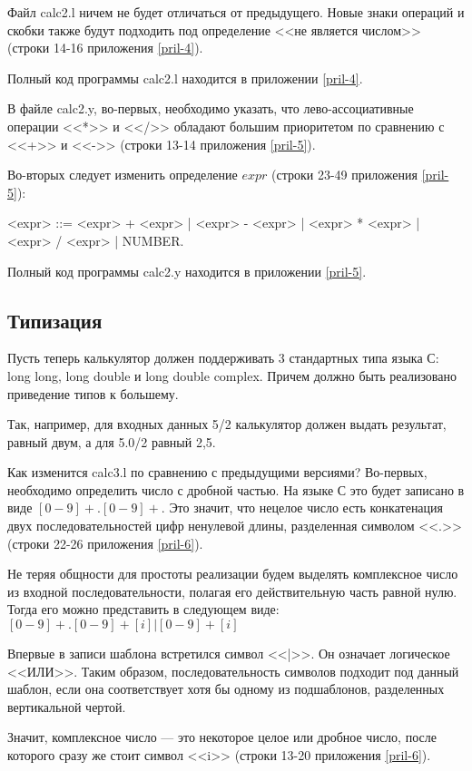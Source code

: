 \documentclass[bachelor, och, coursework, times]{SCWorks}
\begin{document}
Файл calc2.l ничем не будет отличаться от предыдущего. Новые знаки операций и скобки также будут подходить под определение <<не является числом>> (строки 14-16 приложения \ref{pril-4}).

Полный код программы calc2.l находится в приложении \ref{pril-4}.

В файле calc2.y, во-первых, необходимо указать, что лево-ассоциативные операции <<*>> и <</>> обладают большим приоритетом по сравнению с <<+>> и <<->> (строки 13-14 приложения \ref{pril-5}).

Во-вторых следует изменить определение $expr$ (строки 23-49 приложения \ref{pril-5}): 

<expr> ::= <expr> + <expr> | <expr> - <expr> | <expr> * <expr> | <expr> / <expr> | NUMBER.

Полный код программы calc2.y находится в приложении \ref{pril-5}.

\subsection{Типизация}
Пусть теперь калькулятор должен поддерживать 3 стандартных типа языка С: long long, long double и long double complex. Причем должно быть реализовано приведение типов к большему.

Так, например, для входных данных 5/2 калькулятор должен выдать результат, равный двум, а для 5.0/2 равный 2,5.

Как изменится calc3.l по сравнению с предыдущими версиями?
Во-первых, необходимо определить число с дробной частью. На языке С это будет записано в виде $[0-9]+.[0-9]+$. Это значит, что нецелое число есть конкатенация двух последовательностей цифр ненулевой длины, разделенная символом <<.>>(строки 22-26 приложения \ref{pril-6}).

Не теряя общности для простоты реализации будем выделять комплексное число из входной последовательности, полагая его действительную часть равной нулю.
Тогда его можно представить в следующем виде: \linebreak
$[0-9]+.[0-9]+[i] | [0-9]+[i]$

Впервые в записи шаблона встретился символ <<|>>. Он означает логическое <<ИЛИ>>. Таким образом, последовательность символов подходит под данный шаблон, если она соответствует хотя бы одному из подшаблонов, разделенных вертикальной чертой.

Значит, комплексное число --- это некоторое целое или дробное число, после которого сразу же стоит символ <<i>> (строки 13-20 приложения  \ref{pril-6}).
\end{document}
